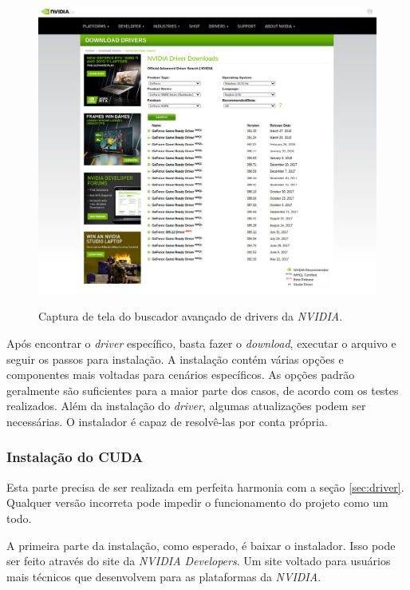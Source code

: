 \begin{figure}[H]
    \centering
    \caption{Captura de tela do buscador avançado de drivers da \textit{NVIDIA}.}
    \includegraphics[width=14cm]{fig/nvidia_driver_advanced.png}
    \label{fig:nvidia-site:fig24}
\end{figure}

Após encontrar o \textit{driver} específico, basta fazer o \textit{download}, executar o arquivo e seguir os passos para instalação. A instalação contém várias opções e componentes mais voltadas para cenários específicos. As opções padrão geralmente são suficientes para a maior parte dos casos, de acordo com os testes realizados. Além da instalação do \textit{driver}, algumas atualizações podem ser necessárias. O instalador é capaz de resolvê-las por conta própria.

\subsubsection{Instalação do CUDA}
\label{sec:cuda}

Esta parte precisa de ser realizada em perfeita harmonia com a seção \ref{sec:driver}. Qualquer versão incorreta pode impedir o funcionamento do projeto como um todo.

A primeira parte da instalação, como esperado, é baixar o instalador. Isso pode ser feito através do site da \textit{NVIDIA Developers}. Um site voltado para usuários mais técnicos que desenvolvem para as plataformas da \textit{NVIDIA}.

